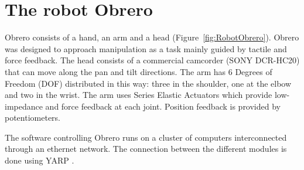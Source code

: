 \section{The robot Obrero}
\label{sec:platform}
%
Obrero \cite{obrero} consists of a hand, an arm and a head
(Figure~\ref{fig:RobotObrero}). Obrero was designed to approach
manipulation as a task mainly guided by tactile and force feedback.
The head consists of a
commercial camcorder (SONY DCR-HC20) that can move along the pan
and tilt directions. The arm has 6 Degrees of Freedom (DOF)
distributed in this way: three in the shoulder, one at the elbow
and two in the wrist. The arm \cite{AaronArm} uses Series Elastic
Actuators \cite{williamson95series} which provide low-impedance
and force feedback at each joint. Position feedback is provided by
potentiometers.

The software controlling Obrero runs on a cluster of computers
interconnected through an ethernet network. The connection between
the different modules is done using YARP \cite{yarpPaper}.
%
